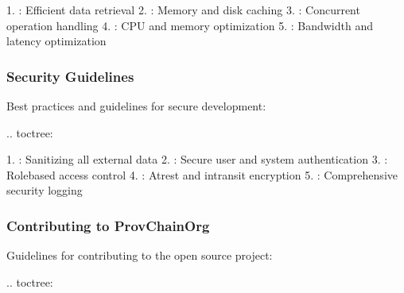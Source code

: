 \documentclass[letterpaper,10pt,english]{sphinxmanual}
\begin{document}
\sphinxAtStartPar
{}
1. : Efficient data retrieval
2. : Memory and disk caching
3. : Concurrent operation handling
4. : CPU and memory optimization
5. : Bandwidth and latency optimization


\subsubsection{Security Guidelines}
\label{\detokenize{developer/index:security-guidelines}}
\sphinxAtStartPar
Best practices and guidelines for secure development:

\sphinxAtStartPar
{}
.. toctree:

\begin{sphinxVerbatim}[commandchars=\\\{\}]
 
  

\end{sphinxVerbatim}

\sphinxAtStartPar
{}
1. : Sanitizing all external data
2. : Secure user and system authentication
3. : Role\sphinxhyphen{}based access control
4. : At\sphinxhyphen{}rest and in\sphinxhyphen{}transit encryption
5. : Comprehensive security logging


\subsubsection{Contributing to ProvChainOrg}
\label{\detokenize{developer/index:contributing-to-provchainorg}}
\sphinxAtStartPar
Guidelines for contributing to the open source project:

\sphinxAtStartPar
{}
.. toctree:

\begin{sphinxVerbatim}[commandchars=\\\{\}]
 
 

\end{sphinxVerbatim}
\end{document}
